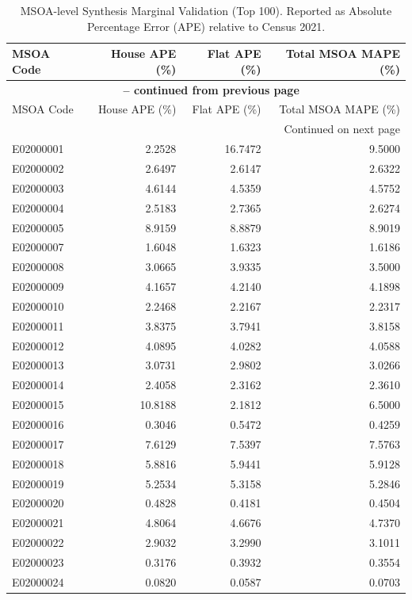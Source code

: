 \documentclass[11pt, a4paper]{article}
\begin{document}
\begin{longtable}{lrrr}
\caption{MSOA-level Synthesis Marginal Validation (Top 100). Reported as Absolute Percentage Error (APE) relative to Census 2021.} \label{tab:supp_conv} \\
\toprule
MSOA Code & House APE (\%) & Flat APE (\%) & Total MSOA MAPE (\%) \\
\midrule
\endfirsthead
\multicolumn{4}{c}{{\bfseries \tablename\ \thetable{} -- continued from previous page}} \\
\toprule
MSOA Code & House APE (\%) & Flat APE (\%) & Total MSOA MAPE (\%) \\
\midrule
\endhead
\midrule
\multicolumn{4}{r}{{Continued on next page}} \\
\endfoot
\bottomrule
\endlastfoot
E02000001 & 2.2528 & 16.7472 & 9.5000 \\
E02000002 & 2.6497 & 2.6147 & 2.6322 \\
E02000003 & 4.6144 & 4.5359 & 4.5752 \\
E02000004 & 2.5183 & 2.7365 & 2.6274 \\
E02000005 & 8.9159 & 8.8879 & 8.9019 \\
E02000007 & 1.6048 & 1.6323 & 1.6186 \\
E02000008 & 3.0665 & 3.9335 & 3.5000 \\
E02000009 & 4.1657 & 4.2140 & 4.1898 \\
E02000010 & 2.2468 & 2.2167 & 2.2317 \\
E02000011 & 3.8375 & 3.7941 & 3.8158 \\
E02000012 & 4.0895 & 4.0282 & 4.0588 \\
E02000013 & 3.0731 & 2.9802 & 3.0266 \\
E02000014 & 2.4058 & 2.3162 & 2.3610 \\
E02000015 & 10.8188 & 2.1812 & 6.5000 \\
E02000016 & 0.3046 & 0.5472 & 0.4259 \\
E02000017 & 7.6129 & 7.5397 & 7.5763 \\
E02000018 & 5.8816 & 5.9441 & 5.9128 \\
E02000019 & 5.2534 & 5.3158 & 5.2846 \\
E02000020 & 0.4828 & 0.4181 & 0.4504 \\
E02000021 & 4.8064 & 4.6676 & 4.7370 \\
E02000022 & 2.9032 & 3.2990 & 3.1011 \\
E02000023 & 0.3176 & 0.3932 & 0.3554 \\
E02000024 & 0.0820 & 0.0587 & 0.0703 \\

\end{longtable}
\end{document}
